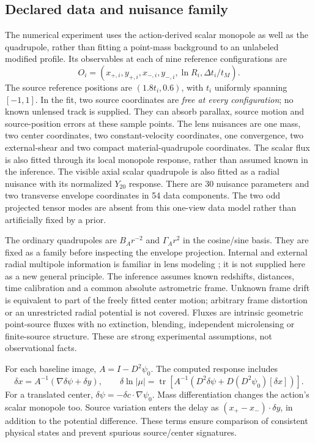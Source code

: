 \documentclass[11pt,a4paper]{article}
\newcommand{\tr}{\operatorname{tr}}
\begin{document}
\subsection{Declared data and nuisance family}

The numerical experiment uses the action-derived scalar monopole as well
as the quadrupole, rather than fitting a point-mass background to an
unlabeled modified profile. Its observables at each of nine reference
configurations are
\begin{equation}
 O_i=(x_{+,i},y_{+,i},x_{-,i},y_{-,i},\ln R_i,\Delta t_i/t_M).
\end{equation}
The source reference positions are $(1.8t_i,0.6)$, with $t_i$ uniformly
spanning $[-1,1]$. In the fit, two source coordinates are \emph{free at
every configuration}; no known unlensed track is supplied. They can
absorb parallax, source motion and source-position errors at these sample
points. The lens nuisances are one mass, two center coordinates, two
constant-velocity coordinates, one convergence, two external-shear and
two compact material-quadrupole coordinates. The scalar flux is also
fitted through its local monopole response, rather than assumed known in
the inference. The visible axial scalar quadrupole is also fitted as a
radial nuisance with its normalized $Y_{20}$ response. There are 30 nuisance
parameters and two transverse envelope coordinates in 54 data components.
The two odd projected tensor modes are absent from this one-view data
model rather than artificially fixed by a prior.

The ordinary quadrupoles are $B_A r^{-2}$ and $\Gamma_A r^2$ in the
cosine/sine basis. They are fixed as a family before inspecting the
envelope projection. Internal and external radial multipole information
is familiar in lens modeling \cite{Bernstein2009}; it is not supplied
here as a new general principle. The inference assumes known redshifts,
distances, time calibration and a common absolute astrometric frame.
Unknown frame drift is equivalent to part of the freely fitted center
motion; arbitrary frame distortion or an unrestricted radial potential
is not covered. Fluxes are intrinsic geometric point-source fluxes with
no extinction, blending, independent microlensing or finite-source
structure. These are strong experimental assumptions, not observational
facts.

For each baseline image, $A=I-D^2\psi_0$. The computed response includes
\begin{equation}
 \delta x=A^{-1}(\nabla\delta\psi+\delta y),\qquad
 \delta\ln|\mu|=\tr\!\left[A^{-1}
      (D^2\delta\psi+D(D^2\psi_0)[\delta x])\right].
\label{eq:generalresponse}
\end{equation}
For a translated center, $\delta\psi=-\delta c\cdot\nabla\psi_0$.
Mass differentiation changes the action's scalar monopole too. Source
variation enters the delay as
$(x_+-x_-)\cdot\delta y$, in addition to the potential difference.
These terms ensure comparison of consistent physical states and prevent
spurious source/center signatures.
\end{document}
